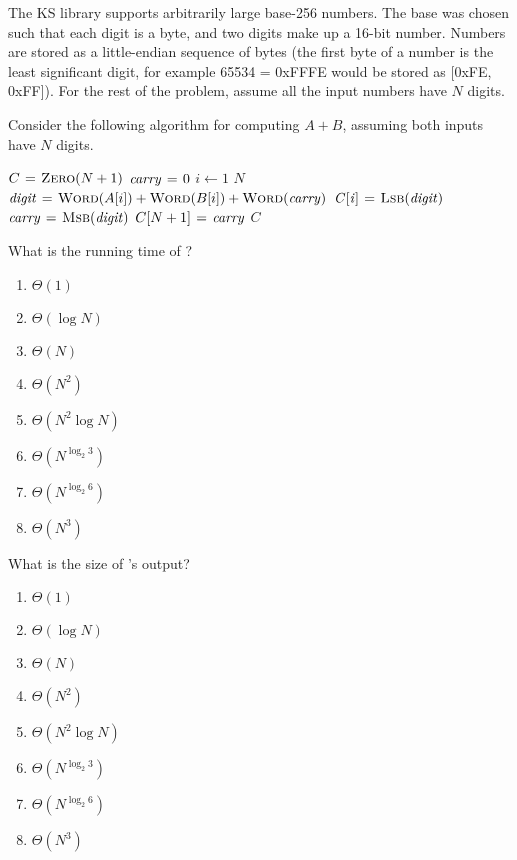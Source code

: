 \documentclass[12pt,twoside]{article}
\begin{document}
\begin{problems}
The KS library supports arbitrarily large base-256 numbers. The base was chosen
such that each digit is a byte, and two digits make up a 16-bit number. Numbers
are stored as a little-endian sequence of bytes (the first byte of a number is
the least significant digit, for example 65534 = 0xFFFE would be stored as
[0xFE, 0xFF]). For the rest of the problem, assume all the input numbers have
$N$ digits.

Consider the following algorithm for computing $A + B$, assuming both inputs
have $N$ digits.

\begin{codebox}
\li $C \mathrel{\hspace{1pt}=\hspace{1pt}} \textnormal{\scshape Zero}(N + 1)$ 
\li $\id{carry} \gets 0$
\li \For $i \gets 1$ \To $N$ \label{li:add-for}
\li   \Do
        $\id{digit} \gets \proc{Word}(A[i]) + \proc{Word}(B[i]) +
        \proc{Word}(\id{carry})$
\li     $\id{C[i]} \gets \proc{Lsb}(\id{digit})$
\li     $\id{carry} \gets \proc{Msb}(\id{digit})$
      \End
\li $C[N + 1] \gets \id{carry}$
\li \Return $C$
\end{codebox}

\begin{problemparts}
\problempart {} What is the running time of ?
\begin{enumerate}
  \item $\Theta(1)$
  \item $\Theta(\log N)$
  \item $\Theta(N)$
  \item $\Theta(N^2)$
  \item $\Theta(N^2 \log N)$
  \item $\Theta(N^{\log_2 3})$
  \item $\Theta(N^{\log_2 6})$
  \item $\Theta(N^3)$
\end{enumerate}

\problempart {} What is the size of 's output?
\begin{enumerate}
  \item $\Theta(1)$
  \item $\Theta(\log N)$
  \item $\Theta(N)$
  \item $\Theta(N^2)$
  \item $\Theta(N^2 \log N)$
  \item $\Theta(N^{\log_2 3})$
  \item $\Theta(N^{\log_2 6})$
  \item $\Theta(N^3)$
\end{enumerate}


\end{problemparts}
\end{problems}
\end{document}
